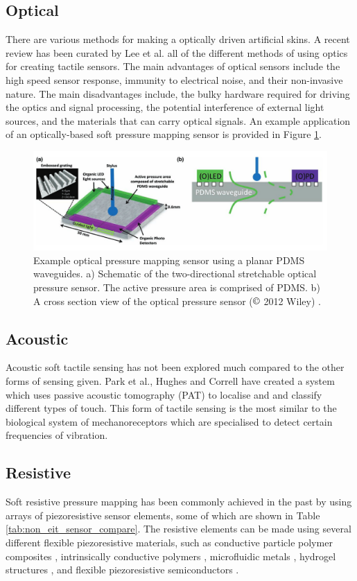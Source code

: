 \subsection{Optical}
There are various methods for making a optically driven artificial skins. A recent review has been curated by Lee et al. \cite{Lee2023} all of the different methods of using optics for creating tactile sensors. The main advantages of optical sensors include the high speed sensor response, immunity to electrical noise, and their non-invasive nature. The main disadvantages include, the bulky hardware required for driving the optics and signal processing, the potential interference of external light sources, and the materials that can carry optical signals. An example application of an optically-based soft pressure mapping sensor is provided in Figure \ref{fig:optical_soft_mapping}.
\begin{figure}[H]
	\centering
	\includegraphics[width=0.75\linewidth]{Figures/optical_soft_pressure_mapping.jpg}
	\caption{Example optical pressure mapping sensor using a planar PDMS waveguides. a) Schematic of the two-directional stretchable optical pressure sensor. The active	pressure area is comprised of PDMS. b) A cross section view of the optical pressure sensor ($\copyright$ 2012 Wiley) \cite{Ramuz2012}.}
	\label{fig:optical_soft_mapping}
\end{figure}

\subsection{Acoustic}
Acoustic soft tactile sensing has not been explored much compared to the other forms of sensing given. Park et al., Hughes and Correll \cite{Park2022,Hughes2015} have created a system which uses passive acoustic tomography (PAT) to localise and and classify different types of touch. This form of tactile sensing is the most similar to the biological system of mechanoreceptors which are specialised to detect certain frequencies of vibration.


\subsection{Resistive}
Soft resistive pressure mapping has been commonly achieved in the past by using arrays of piezoresistive sensor elements, some of which are shown in Table \ref{tab:non_eit_sensor_compare}. The resistive elements can be made using several different flexible piezoresistive materials, such as conductive particle polymer composites \cite{Sun2020,Lu2014,Spahr2017}, intrinsically conductive polymers \cite{Lu2014,Hazelton2023,Mukherjee2023}, microfluidic metals \cite{Park2010,Jung2015,Kim2019}, hydrogel structures \cite{Yuk2016,Park2022,Chen2023}, and flexible piezoresistive semiconductors \cite{Xu2023,Sim2019}.

